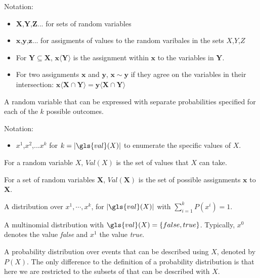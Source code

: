 {%
  Notation:
  \begin{itemize}
    \item $\bm{X}$,$\bm{Y}$,$\bm{Z}$... for sets of \glspl{random variable}
    \item $\bm{x}$,$\bm{y}$,$\bm{z}$... for assigments of values to the random varibales in the sets $X$,$Y$,$Z$
    \item For $\bm{Y}\subseteq \bm{X}$, $\bm{x}\langle \bm{Y}\rangle$ is the assignment within $\bm{x}$ to the variables in $\bm{Y}$.
    \item For two assignments $\bm{x}$ and $\bm{y}$, $\bm{x}\sim \bm{y}$ if they agree on the variables in their intersection: $\bm{x}\langle\bm{X}\cap\bm{Y}\rangle=\bm{y}\langle\bm{X}\cap\bm{Y}\rangle$
  \end{itemize}
}

{%
  A \gls{random variable} that can be expressed with separate probabilities specified for each of the $k$ possible outcomes.

  Notation:
  \begin{itemize}
    \item $x^1$,$x^2$,...$x^k$ for $k=|\gls{val}(X)|$ to enumerate the specific values of $X$.
  \end{itemize}
}

{%
  For a \gls{random variable} $X$, $Val(X)$ is the set of values that $X$ can take.

  For a \gls{set of random variables} $\bm{X}$, $Val(\bm{X})$ is the set of possible assignments $\bm{x}$ to $\bm{X}$.
}

{%
  A distribution over $x^1,\cdots,x^k$, for $|\gls{val}(X)|$ with $\sum_{i=1}^k P(x^i)=1$.
}

{%
  A \gls{multinomial distribution} with $\gls{val}(X)=\{false,true\}$. Typically, $x^0$ denotes the value \textit{false} and $x^1$ the value \textit{true}.
}

{%
  A \gls{probability distribution} over events that can be described using $X$, denoted by $P(X)$. The only difference to the definition of a \gls{probability distribution} is that here we are restricted to the subsets of  that can be described with $X$.
}

